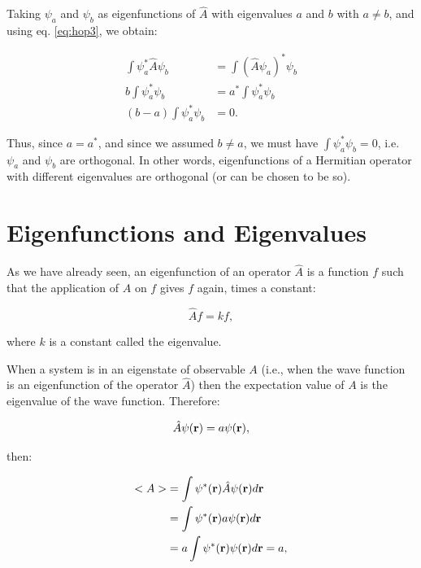 \documentclass[
  9pt,
]{extbook}
\theoremstyle{definition}
\theoremstyle{definition}
\theoremstyle{definition}
\theoremstyle{remark}
\begin{document}
Taking \(\psi_a\) and \(\psi_b\) as eigenfunctions of \(\hat{A}\) with eigenvalues \(a\) and \(b\) with \(a \neq b\), and using eq. \eqref{eq:hop3}, we obtain:

\begin{equation}
\begin{aligned}
\int \psi_a^{*} \hat{A} \psi_b &= \int (\hat{A} \psi_a)^{*} \psi_b	\\
b \int \psi_a^{*} \psi_b	&= a^{*} \int \psi_a^{*} \psi_b \\
(b - a) \int \psi_a^{*} \psi_b &= 0.
\end{aligned}
\label{eq:hop5}
\end{equation}

Thus, since \(a = a^{*}\), and since we assumed \(b \neq a\), we must have \(\int \psi_a^{*} \psi_b = 0\), i.e.~\(\psi_a\) and \(\psi_b\) are orthogonal. In other words, eigenfunctions of a Hermitian operator with different eigenvalues are orthogonal (or can be chosen to be so).

\hypertarget{eigenfunctions-and-eigenvalues}{%
\section{Eigenfunctions and Eigenvalues}\label{eigenfunctions-and-eigenvalues}}

As we have already seen, an eigenfunction of an operator \(\hat{A}\) is a function \(f\) such that the application of \(\hat{A}\) on \(f\) gives \(f\) again, times a constant:

\begin{equation}
\hat{A} f = k f,
\label{eq:ee1}
\end{equation}

where \(k\) is a constant called the eigenvalue.

When a system is in an eigenstate of observable \(A\) (i.e., when the wave function is an eigenfunction of the operator \(\hat{A}\)) then the expectation value of \(A\) is the eigenvalue of the wave function. Therefore:

\begin{equation}
\hat{A} \psi({\bf r}) = a \psi({\bf r}),
\label{eq:ee2}
\end{equation}

then:

\begin{equation}
\begin{aligned}
<A> &= \int \psi^{*}({\bf r}) \hat{A} \psi({\bf r}) d{\bf r} \\
&= \int \psi^{*}({\bf r}) a \psi({\bf r}) d{\bf r} \\	 
&= a \int \psi^{*}({\bf r}) \psi({\bf r}) d{\bf r} = a,	 
\end{aligned}
\label{eq:ee3}
\end{equation}
\end{document}

